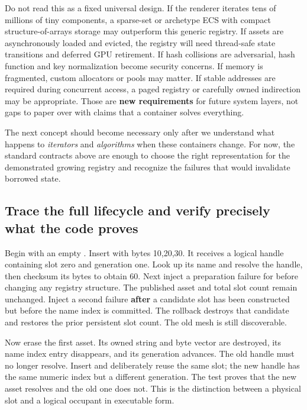 Do not read this as a fixed universal design. If the renderer iterates tens of millions of tiny components, a sparse-set or archetype ECS with compact structure-of-arrays storage may outperform this generic registry. If assets are asynchronously loaded and evicted, the registry will need thread-safe state transitions and deferred GPU retirement. If hash collisions are adversarial, hash function and key normalization become security concerns. If memory is fragmented, custom allocators or pools may matter. If stable addresses are required during concurrent access, a paged registry or carefully owned indirection may be appropriate. Those are \textbf{new requirements} for future system layers, not gaps to paper over with claims that a container solves everything.

The next concept should become necessary only after we understand what happens to \emph{iterators} and \emph{algorithms} when these containers change. For now, the standard contracts above are enough to choose the right representation for the demonstrated growing registry and recognize the failures that would invalidate borrowed state.

\subsection{Trace the full lifecycle and verify precisely what the code proves}\label{01-foundations-i-ch006-trace-the-full-lifecycle-and-verify-precisely-what-the-code-proves}

\hypertarget{01-foundations-i-ch006-trace-the-full-lifecycle-and-verify-precisely-what-the-code-proves}{}

Begin with an empty . Insert  with bytes 10,20,30. It receives a logical handle containing slot zero and generation one. Look up its name and resolve the handle, then checksum its bytes to obtain 60. Next inject a preparation failure for  before changing any registry structure. The published asset and total slot count remain unchanged. Inject a second failure \textbf{after} a candidate slot has been constructed but before the name index is committed. The rollback destroys that candidate and restores the prior persistent slot count. The old mesh is still discoverable.

Now erase the first asset. Its owned string and byte vector are destroyed, its name index entry disappears, and its generation advances. The old handle must no longer resolve. Insert  and deliberately reuse the same slot; the new handle has the same numeric index but a different generation. The test proves that the new asset resolves and the old one does not. This is the distinction between a physical slot and a logical occupant in executable form.

